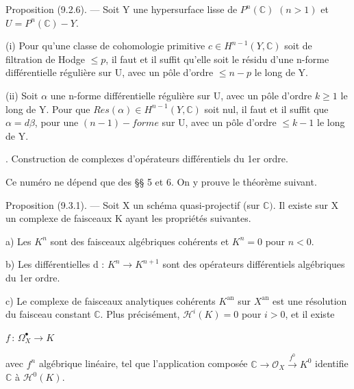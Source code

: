 \documentclass[11pt,twoside]{article}
\newcommand{\DFormula}[1]{%
  \par\smallskip\noindent\hspace*{0pt}\(\displaystyle #1\)\par\smallskip
}
\begin{document}
Proposition (9.2.6). — Soit Y une hypersurface lisse de \(P^{n}(\mathbb{C})\) \((n>1)\) et \(U=P^{n}(\mathbb{C})−Y\).\par
\par\medskip
(i) Pour qu’une classe de cohomologie primitive \(c\in H^{n−1}(Y,\mathbb{C})\) soit de filtration de Hodge \(\leq p\), il faut et il suffit qu’elle soit le résidu d’une n-forme différentielle régulière sur U, avec un pôle d’ordre \(\leq n−p\) le long de Y.\par
\par\medskip
(ii) Soit \(\alpha \) une n-forme différentielle régulière sur U, avec un pôle d’ordre \(k\geq 1\) le long de Y. Pour que \(Res(\alpha )\in H^{n−1}(Y,\mathbb{C})\) soit nul, il faut et il suffit que \(\alpha =d\beta \), pour une \((n−1)-forme\) sur U, avec un pôle d’ordre \(\leq k−1\) le long de Y.\par
\par{}. Construction de complexes d’opérateurs différentiels du 1er ordre.\par
\par\medskip
Ce numéro ne dépend que des §§ 5 et 6. On y prouve le théorème suivant.\par
\par\medskip
Proposition (9.3.1). — Soit X un schéma quasi-projectif (sur \(\mathbb{C})\). Il existe sur X un complexe de faisceaux K ayant les propriétés suivantes.\par
\par\medskip
a) Les \(K^{n}\) sont des faisceaux algébriques cohérents et \(K^{n}=0\) pour \(n<0\).\par
\par\medskip
b) Les différentielles d : \(K^{n}\to K^{n+1}\) sont des opérateurs différentiels algébriques du 1er ordre.\par
\par\medskip
c) Le complexe de faisceaux analytiques cohérents \(K^{\mathrm{an}}\) sur \(X^{\mathrm{an}}\) est une résolution du faisceau constant \(\mathbb{C}\). Plus précisément, \(\mathcal{H}^{i}(K)=0\) pour \(i>0\), et il existe\par
\par\medskip
\DFormula{f\,:\,\Omega _{X}^{\bullet }\to K}
\par\medskip
avec \(f^{n}\) algébrique linéaire, tel que l’application composée \(\mathbb{C}\to \mathcal{O}_{X}\xrightarrow{f^{0}}K^{0}\) identifie \(\mathbb{C}\) à \(\mathcal{H}^{0}(K)\).\par
\par\medskip
\end{document}
